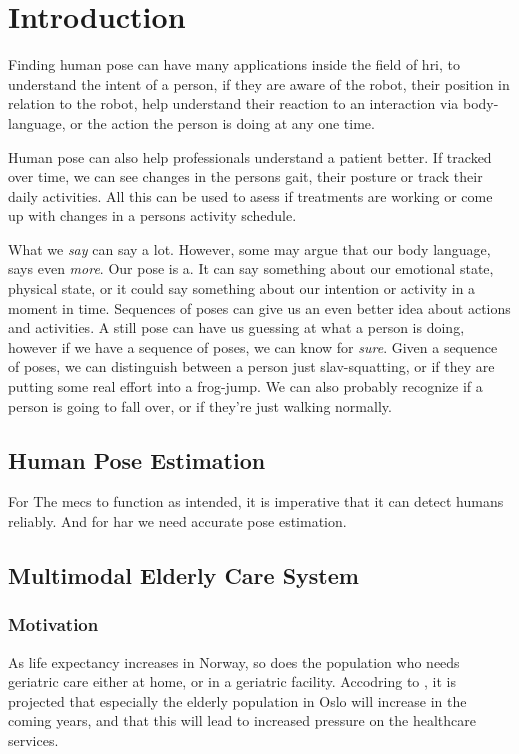 \chapter{Introduction}

Finding human pose can have many applications inside the field of \gls{hri}, to understand the intent of a person, if they are aware of the robot, their position in relation to the robot, help understand their reaction to an interaction via body-language, or the action the person is doing at any one time.

Human pose can also help professionals understand a patient better. If tracked over time, we can see changes in the persons gait, their posture or track their daily activities. All this can be used to asess if treatments are working or come up with changes in a persons activity schedule.


What we \textit{say} can say a lot. However, some may argue that our body language, says even \textit{more}. Our pose is a. It can say something about our emotional state, physical state, or it could say something about our intention or activity in a moment in time. Sequences of poses can give us an even better idea about actions and activities. A still pose can have us guessing at what a person is doing, however if we have a sequence of poses, we can know for \textit{sure}. Given a sequence of poses, we can distinguish between a person just slav-squatting, or if they are putting some real effort into a frog-jump. We can also probably recognize if a person is going to fall over, or if they're just walking normally.




\section{Human Pose Estimation}
For The \gls{mecs} to function as intended, it is imperative that it can detect humans reliably. And for \gls{har} we need accurate pose estimation.

\section{Multimodal Elderly Care System}
\subsection{Motivation}
As life expectancy increases in Norway, so does the population who needs geriatric care either at home, or in a geriatric facility. Accodring to \cite{oslohelsa}, it is projected that especially the elderly population in Oslo will increase in the coming years, and that this will lead to increased pressure on the healthcare services.


